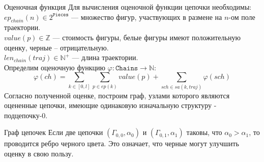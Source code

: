 \begin{frame}{Оценочная функция}
Для вычисления оценочной функции цепочки необходимы: \\
$ep_{chain} \left(n\right) \in 2^{\mathtt{Pieces}}$ --- множество фигур, участвующих в размене на $n$-ом поле траектории. \\
$value\left(p\right) \in \mathbb{Z}$ --- стоимость фигуры, белые фигуры имеют положительную оценку, черные -- отрицательную.\\ 
$len_{chain}\left(traj\right) \in \mathbb{N}^+$ --- длина траектории. \\
Определим оценочную функцию $\varphi \colon \mathtt{Chains} \to \mathbb{N}$:
$$
 \varphi \left( ch \right) = \sum_{k \in \left[0, l\right]} \sum_{ p \in ep\left(k\right)} value\left(p\right) + \sum_{sch \in sa\left(k, traj\right)} \varphi\left(sch\right)
$$
Согласно полученной оценке, построим граф, узлами которого являются оцененные цепочки, имеющие одинаковую изначальную структуру - подцепочку-0.
\end{frame}

\begin{frame}{Граф цепочек}
 Если две цепочки $\left(\Gamma_{0, 0}, \alpha_0\right)$ и $\left(\Gamma_{0, 1}, \alpha_1\right)$ таковы, что $\alpha_0 > \alpha_1$, то проводится ребро черного цвета. Это означает, что черные могут улучшить оценку в свою пользу. 
\end{frame}


